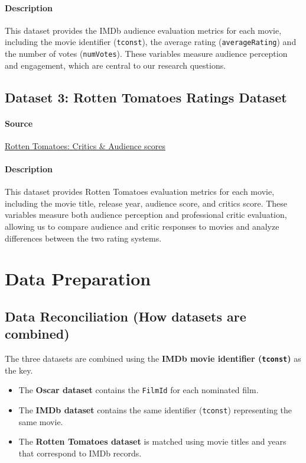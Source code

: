 \documentclass[12pt]{article}
\begin{document}
\paragraph{Description}
This dataset provides the IMDb audience evaluation metrics for each movie, including the movie identifier (\texttt{tconst}), the average rating (\texttt{averageRating}) and the number of votes (\texttt{numVotes}). These variables measure audience perception and engagement, which are central to our research questions.

\subsection{Dataset 3: Rotten Tomatoes Ratings Dataset}

\paragraph{Source}
\href{https://www.kaggle.com/datasets/matepapava/rotten-tomatoes-critics-and-audience-scores}{Rotten Tomatoes: Critics \& Audience scores}

\paragraph{Description}
This dataset provides Rotten Tomatoes evaluation metrics for each movie, including the movie title, release year, audience score, and critics score. These variables measure both audience perception and professional critic evaluation, allowing us to compare audience and critic responses to movies and analyze differences between the two rating systems.

\section{Data Preparation}

\subsection{Data Reconciliation (How datasets are combined)}
The three datasets are combined using the \textbf{IMDb movie identifier (\texttt{tconst})} as the key.

\begin{itemize}[leftmargin=1.5em]
    \item The \textbf{Oscar dataset} contains the \texttt{FilmId} for each nominated film.
    \item The \textbf{IMDb dataset} contains the same identifier (\texttt{tconst}) representing the same movie.
    \item The \textbf{Rotten Tomatoes dataset} is matched using movie titles and years that correspond to IMDb records.
\end{itemize}
\end{document}
